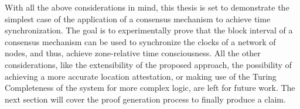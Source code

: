 With all the above considerations in mind, this thesis is set to demonstrate the simplest case of the application of a consensus mechanism to achieve time synchronization. The goal is to experimentally prove that the block interval of a consensus mechanism can be used to synchronize  the clocks of a network of nodes, and thus, achieve zone-relative time consciousness. All the other considerations, like the extensibility of the proposed approach, the possibility of achieving a more accurate location attestation, or making use of the Turing Completeness of the system for more complex logic, are left for future work. The next section will cover the proof generation process to finally produce a \pol{} claim.